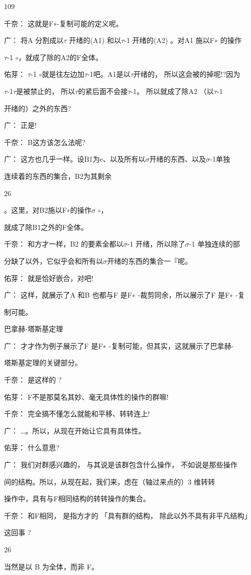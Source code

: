 109\par
千奈： 这就是F∗-复制可能的定义呢。\par
广： 将A 分割成以$\tau$ 开绪的(A1) 和以$\tau$-1 开绪的(A2) 。对A1 施以F∗ 的操作\par
$\tau$-1 $\circ$，就成了除的A2的F全体。\par
佑芽： $\tau$-1 $\circ$就是往左边加$\tau$-1吧。A1是以$\tau$开绪的， 所以这会被的掉呢!?因为\par
$\tau$-1$\tau$是被禁止的， 所以$\tau$的紧后面不会接$\tau$-1。 所以就成了除A2 （以$\tau$-1\par
开绪的）之外的东西?\par
广： 正是!\par
千奈： B这方该怎么法呢?\par
广： 这方也几乎一样。设B1为e、以及所有以$\sigma$开绪的东西、以及$\sigma$-1单独\par
连续着的东西的集合，B2为其剩余\par
26\par
。这里，对B2施以F∗的操作$\sigma$ $\circ$，\par
就成了除B1之外的F全体。\par
千奈： 和方才一样，B2 的要素全都以$\sigma$-1 开绪，所以除了$\sigma$-1 单独连续的部\par
分缺了以外，它似乎会和所有以$\sigma$开绪的东西的集合一『呢。\par
佑芽： 就是恰好嵌合，对吧!\par
广： 这样，就展示了A 和B 也都与F 是F∗ -裁剪同余，所以展示了F 是F∗ -复\par
制可能。\par
巴拿赫-塔斯基定理\par
广： 才才作为例子展示了F 是F∗ -复制可能，但其实，这就展示了巴拿赫-\par
塔斯基定理的关键部分。\par
千奈： 是这样的 ?\par
佑芽： F不是那莫名其妙、毫无具体性的操作的群嘛!\par
千奈： 完全搞不懂怎么就能和平移、转转连上!\par
广： …。所以，从现在开始让它具有具体性。\par
佑芽： 什么意思?\par
广： 我们对群感兴趣的， 与其说是该群包含什么操作， 不如说是那些操作\par
间的结构。所以，从现在起，我们来，虑在（轴过来点的）3 维转转\par
操作中，具有与F相同结构的转转操作的集合。\par
千奈： 和F相同， 是指方才的 「具有群的结构， 除此以外不具有非平凡结构」\par
这回事 ?\par
26\par
当然是以 B 为全体，而非 F。\par

